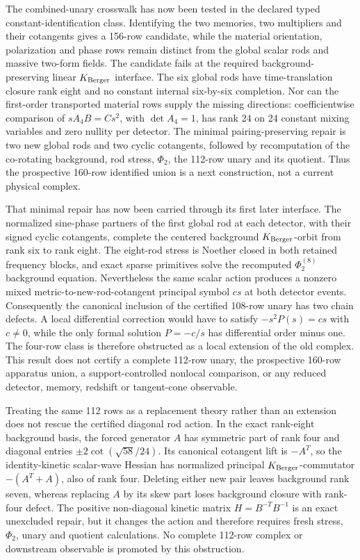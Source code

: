 \documentclass[11pt]{article}
\theoremstyle{definition}
\theoremstyle{remark}
\begin{document}
The combined-unary crosswalk has now been tested in the declared typed
constant-identification class.  Identifying the two memories, two
multipliers and their cotangents gives a 156-row candidate, while the
material orientation, polarization and phase rows remain distinct from the
global scalar rods and massive two-form fields.  The candidate fails at the
required background-preserving linear \(K_{\rm Berger}\) interface.  The
six global rods have time-translation closure rank eight and no constant
internal six-by-six completion.  Nor can the first-order transported
material rows supply the missing directions: coefficientwise comparison of
\(sA_4B=Cs^2\), with \(\det A_4=1\), has rank 24 on 24 constant mixing
variables and zero nullity per detector.  The minimal pairing-preserving
repair is two new global rods and two cyclic cotangents, followed by
recomputation of the co-rotating background, rod stress, \(\Phi_2\), the
112-row unary and its quotient.  Thus the prospective 160-row identified
union is a next construction, not a current physical complex.

That minimal repair has now been carried through its first later interface.
The normalized sine-phase partners of the first global rod at each detector,
with their signed cyclic cotangents, complete the centered background
\(K_{\rm Berger}\)-orbit from rank six to rank eight.  The eight-rod stress
is Noether closed in both retained frequency blocks, and exact sparse
primitives solve the recomputed \(\Phi_2^{(8)}\) background equation.
Nevertheless the same scalar action produces a nonzero mixed
metric-to-new-rod-cotangent principal symbol \(cs\) at both detector events.
Consequently the canonical inclusion of the certified 108-row unary has two
chain defects.  A local differential correction would have to satisfy
\(-s^2P(s)=cs\) with \(c\ne0\), while the only formal solution
\(P=-c/s\) has differential order minus one.  The four-row class is
therefore obstructed as a local extension of the old complex.  This result
does not certify a complete 112-row unary, the prospective 160-row apparatus
union, a support-controlled nonlocal comparison, or any reduced detector,
memory, redshift or tangent-cone observable.

Treating the same 112 rows as a replacement theory rather than an extension
does not rescue the certified diagonal rod action.  In the exact rank-eight
background basis, the forced generator \(A\) has symmetric part of rank four
and diagonal entries \(\pm2\cot(\sqrt{58}/24)\).  Its canonical cotangent
lift is \(-A^T\), so the identity-kinetic scalar-wave Hessian has normalized
principal \(K_{\rm Berger}\)-commutator \(-(A^T+A)\), also of rank four.
Deleting either new pair leaves background rank seven, whereas replacing
\(A\) by its skew part loses background closure with rank-four defect.  The
positive non-diagonal kinetic matrix \(H=B^{-T}B^{-1}\) is an exact
unexcluded repair, but it changes the action and therefore requires fresh
stress, \(\Phi_2\), unary and quotient calculations.  No complete 112-row
complex or downstream observable is promoted by this obstruction.
\end{document}
